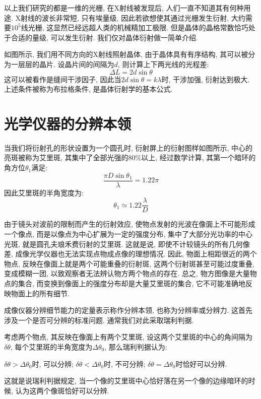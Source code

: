 以上我们研究的都是一维的光栅, 在X射线被发现后, 人们一直不知道其有何种用途. X射线的波长非常短, 只有埃量级, 因此若欲想使其通过光栅发生衍射, 大约需要$10^5$线光栅, 这显然已经远超人类的机械精加工极限. 但是晶体的晶格常数恰巧处于合适的量级, 可以发生衍射. 我们仅对晶体衍射做一简单介绍.

如图所示, 我们用不同方向的X射线照射晶体, 由于晶体具有有序结构, 其可以被分为一层层的晶片. 设晶片间的间隔为$d$, 则计算上下两光线的光程差:
\[
\Delta L=2d\sin\theta
\]
这可以被看作是缝间干涉因子, 因此当$2d\sin\theta = k\lambda$时, 干涉加强, 衍射达到极大. 上述条件被称为布拉格条件, 是晶体衍射学的基本公式.

\section{光学仪器的分辨本领}


当我们将衍射孔的形状设置为一个圆孔时, 衍射屏上的衍射图样如图所示, 中心的亮斑被称为艾里斑, 其集中了全部光强的$80\%$以上, 经过数学计算, 其第一个暗环的角方位$\theta_{1}$满足:
\[
\frac{\pi D \sin\theta_1}{\lambda} = 1.22\pi
\]
因此艾里斑的半角宽度为:
\[
\theta_1 \simeq 1.22\frac{\lambda}{D}
\]

由于镜头对波前的限制而产生的衍射效应, 使物点发射的光波在像面上不可能形成一个像点, 而是以像点为中心扩展为一定的强度分布, 集中了大部分光功率的中心光斑, 就是圆孔夫琅禾费衍射的艾里斑. 这就是说, 即使不计较镜头的所有几何像差, 成像光学仪器也无法实现点物成点像的理想情况. 因此, 物面上相距很近的两个物点, 反映在像面上就是两个可能重叠的衍射斑, 这两个衍射斑甚至可能过度重叠, 变成模糊一团, 以致观察者无法辨认物方两个物点的存在. 总之, 物方图像是大量物点的集合, 而变换到像面上的强度分布却是大量艾里斑的集合, 它不可能准确地反映物面上的所有细节.

成像仪器分辨细节能力的定量表示称作分辨本领, 也称为分辨率或分辨力. 这首先涉及一个是否可分辨的标准问题. 通常我们对此采取瑞利判据.

考虑两个物点, 其反映在像面上有两个艾里斑, 设这两个艾里斑的中心的角间隔为$\delta \theta$, 每个艾里斑的半角宽度为$\Delta \theta_0$, 那么瑞利判据认为:
\begin{center}
    $\delta \theta > \Delta \theta_0$时, 可以分辨; $\delta \theta < \Delta \theta_0$时, 不可分辨; $\delta \theta = \Delta \theta_0$时恰好可以分辨.
\end{center}

这就是说瑞利判据规定, 当一个像的艾里斑中心恰好落在另一个像的边缘暗环的时候, 认为这两个像斑恰好可以分辨.

